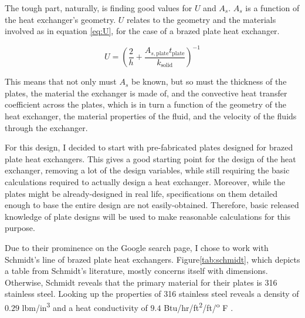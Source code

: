 \documentclass[12pt,letterpaper]{article}
\begin{document}
The tough part, naturally, is finding good values for \(U\) and \(A_s\). \(A_s\) is a function of the heat exchanger's geometry.  \(U\) relates to the geometry and the materials involved as in equation \ref{eq:U}, for the case of a brazed plate heat exchanger.

\begin{equation}
\label{eq:U}
U = \left(\frac{2}{h} + \frac{A_{s, \textrm{plate}} t_{\textrm{plate}}}{k_{\textrm{solid}}} \right)^{-1}
\end{equation}

This means that not only must \(A_s\) be known, but so must the thickness of the plates, the material the exchanger is made of, and the convective heat transfer coefficient across the plates, which is in turn a function of the geometry of the heat exchanger, the material properties of the fluid, and the velocity of the fluids through the exchanger.

For this design, I decided to start with pre-fabricated plates designed for brazed plate heat exchangers. This gives a good starting point for the design of the heat exchanger, removing a lot of the design variables, while still requiring the basic calculations required to actually design a heat exchanger. Moreover, while the plates might be already-designed in real life, specifications on them detailed enough to base the entire design are not easily-obtained. Therefore, basic released knowledge of plate designs will be used to make reasonable calculations for this purpose.

Due to their prominence on the Google search page, I chose to work with Schmidt's line of brazed plate heat exchangers. Figure\ref{tab:schmidt}, which depicts a table from Schmidt's literature, mostly concerns itself with dimensions. Otherwise, Schmidt reveals that the primary material for their plates is 316 stainless steel. Looking up the properties of 316 stainless steel reveals a density of \(0.29\) lbm/in\textsuperscript{3} and a heat conductivity of \(9.4\) Btu/hr/ft\textsuperscript{2}/ft/\textsuperscript{o} F .
\end{document}
